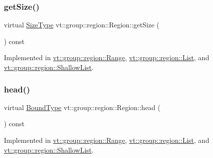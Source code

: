 \mbox{\label{structvt_1_1group_1_1region_1_1_region_ab0db5f78c57943b4b9973ba2c7c619f7}} 
\subsubsection{\texorpdfstring{get\+Size()}{getSize()}}
{\footnotesize\ttfamily virtual \hyperlink{structvt_1_1group_1_1region_1_1_region_a9bb381adf31111aae34dbc644bad6c1f}{Size\+Type} vt\+::group\+::region\+::\+Region\+::get\+Size (\begin{DoxyParamCaption}{ }\end{DoxyParamCaption}) const\hspace{0.3cm}{\ttfamily [pure virtual]}}



Implemented in \hyperlink{structvt_1_1group_1_1region_1_1_range_a111a632a4bba6b6940a3d036bd4cba76}{vt\+::group\+::region\+::\+Range}, \hyperlink{structvt_1_1group_1_1region_1_1_list_a9a74188a75483097c41253616527ac46}{vt\+::group\+::region\+::\+List}, and \hyperlink{structvt_1_1group_1_1region_1_1_shallow_list_a6b8fe82607fdcf88ac33ad387192fbb2}{vt\+::group\+::region\+::\+Shallow\+List}.

\mbox{\label{structvt_1_1group_1_1region_1_1_region_a09d21333389937f11dd5d3e6ba566c54}} 
\subsubsection{\texorpdfstring{head()}{head()}}
{\footnotesize\ttfamily virtual \hyperlink{structvt_1_1group_1_1region_1_1_region_abf426ff85bed72c1c6524fad6a9f1751}{Bound\+Type} vt\+::group\+::region\+::\+Region\+::head (\begin{DoxyParamCaption}{ }\end{DoxyParamCaption}) const\hspace{0.3cm}{\ttfamily [pure virtual]}}



Implemented in \hyperlink{structvt_1_1group_1_1region_1_1_range_ab6abce20eb32475d0ae734770b6586c0}{vt\+::group\+::region\+::\+Range}, \hyperlink{structvt_1_1group_1_1region_1_1_list_a99c726e227dbac4f8efaa45a37033238}{vt\+::group\+::region\+::\+List}, and \hyperlink{structvt_1_1group_1_1region_1_1_shallow_list_a249b65b9cc1a44131cf52488baea9a41}{vt\+::group\+::region\+::\+Shallow\+List}.

